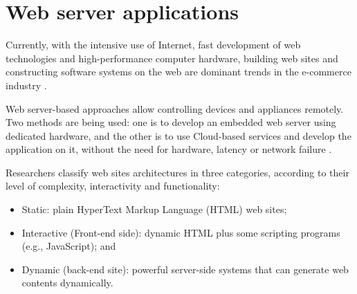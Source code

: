 \section{Web server applications}
\label{sec:websapp}

Currently, with the intensive use of Internet, fast development of web technologies and high-performance computer hardware, building web sites and constructing software systems on the web are dominant trends in the e-commerce industry \cite{attitalla2016, zambonelli2016,laine2011,stroulia2001}. 

Web server-based approaches allow controlling devices and appliances remotely. Two methods are being used: one is to develop an embedded web server using dedicated hardware, and  the other is to use Cloud-based services and develop the application on it, without the need for hardware, latency or network failure \cite{attitalla2016}. 

Researchers \cite{tilley2001}  classify web sites architectures in three categories, according to their level of complexity, interactivity and functionality:
\begin{itemize}
\item Static: plain HyperText Markup Language (HTML) web sites;
\item Interactive (Front-end side): dynamic HTML plus some scripting programs (e.g., JavaScript); and
\item Dynamic (back-end site): powerful server-side systems that can generate web contents dynamically.
\end{itemize}

